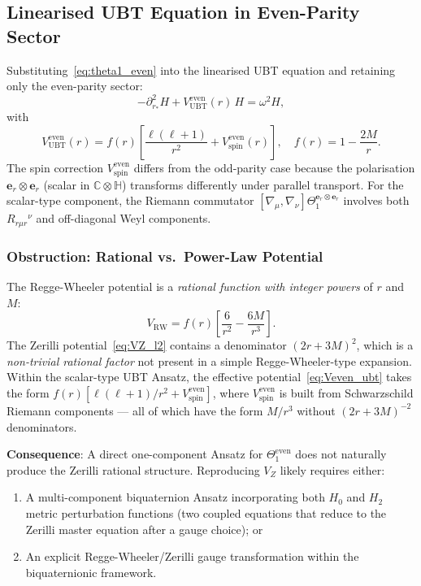 \documentclass[12pt]{article}
\theoremstyle{definition}
\theoremstyle{remark}
\begin{document}
\subsection{Linearised UBT Equation in Even-Parity Sector}

Substituting~\eqref{eq:theta1_even} into the linearised UBT equation
and retaining only the even-parity sector:
\begin{equation}
  -\partial_{r_*}^2 H + V_{\text{UBT}}^{\text{even}}(r)\,H = \omega^2 H,
  \label{eq:even_parity_eq}
\end{equation}
with
\begin{equation}
  V_{\text{UBT}}^{\text{even}}(r) = f(r)\left[
    \frac{\ell(\ell+1)}{r^2} + V_{\text{spin}}^{\text{even}}(r)
  \right],
  \quad f(r) = 1-\frac{2M}{r}.
  \label{eq:Veven_ubt}
\end{equation}
The spin correction $V_{\text{spin}}^{\text{even}}$ differs from the
odd-parity case because the polarisation $\boldsymbol{e}_r \otimes \boldsymbol{e}_r$
(scalar in $\mathbb{C}\otimes\mathbb{H}$) transforms differently under parallel
transport.  For the scalar-type component, the Riemann commutator
$[\nabla_\mu, \nabla_\nu]\Theta_1^{\boldsymbol{e}_r \otimes \boldsymbol{e}_r}$
involves both $R_{r\mu r}{}^\nu$ and off-diagonal Weyl components.

\subsubsection{Obstruction: Rational vs.\ Power-Law Potential}

The Regge-Wheeler potential is a \emph{rational function with integer powers}
of $r$ and $M$:
\begin{equation}
  V_{\text{RW}} = f(r)\left[\frac{6}{r^2} - \frac{6M}{r^3}\right].
\end{equation}
The Zerilli potential~\eqref{eq:VZ_l2} contains a denominator
$(2r+3M)^2$, which is a \emph{non-trivial rational factor} not present
in a simple Regge-Wheeler-type expansion.  Within the scalar-type UBT
Ansatz, the effective potential~\eqref{eq:Veven_ubt} takes the form
$f(r)[\ell(\ell+1)/r^2 + V_{\text{spin}}^{\text{even}}]$, where
$V_{\text{spin}}^{\text{even}}$ is built from Schwarzschild Riemann
components — all of which have the form $M/r^3$ without $(2r+3M)^{-2}$
denominators.

\textbf{Consequence}: A direct one-component Ansatz for
$\Theta_1^{\text{even}}$ does not naturally produce the Zerilli rational
structure.  Reproducing $V_Z$ likely requires either:
\begin{enumerate}
  \item A multi-component biquaternion Ansatz incorporating both $H_0$
        and $H_2$ metric perturbation functions (two coupled equations
        that reduce to the Zerilli master equation after a gauge choice);
        or
  \item An explicit Regge-Wheeler/Zerilli gauge transformation within
        the biquaternionic framework.
\end{enumerate}
\end{document}
